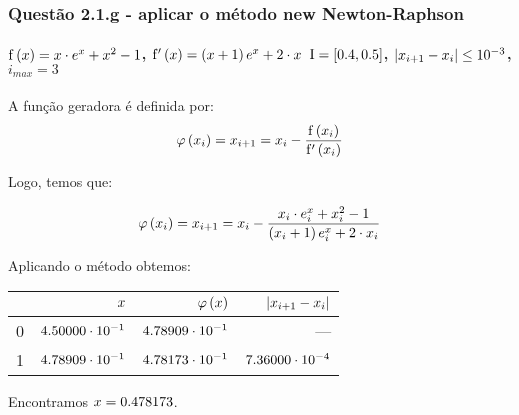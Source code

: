 \begin{frame}
\frametitle{Questão 2.1.g - aplicar o método new Newton-Raphson}
\framesubtitle{$\mathrm{f}\left(x\right) = x \cdot e^x + x^2 - 1$,
$\mathrm{f}'\left(x\right) = \left(x + 1\right)e^x + 2 \cdot x$ 
$\mathrm{I} = [0.4,0.5]$, $|x_{i+1} - x_i| \leq 10^{-3}$, $i_{max} = 3$}

A função geradora é definida por: 
\[
\varphi\left(x_i\right) = x_{i+1} = x_i -
\frac{\mathrm{f}\left(x_i\right)}{\mathrm{f}'\left(x_i\right)}
\]

Logo, temos que:
 
\[
\varphi\left(x_i\right) = x_{i+1} = x_i -
\frac{x_i \cdot e^x_i + x_i^2 - 1}
{\left(x_i + 1\right)e^x_i + 2 \cdot x_i}
\]

Aplicando o método obtemos:\\
{\scriptsize
\begin{center}
\begin{tabular}{r|r|r|r}
  &
  $x$ &
  $\varphi\left(x\right)$ &
  $|x_{i+1} - x_i|$\\
\hline
\hline
0 & $4.50000 \cdot 10^{-1}$ & $4.78909 \cdot 10^{-1}$ & ---\\
\hline
1 & $4.78909 \cdot 10^{-1}$ & $4.78173 \cdot 10^{-1}$ 
  & $7.36000 \cdot 10^{-4}$\\
\hline
\end{tabular}
\end{center}
}

Encontramos $x = 0.478173$.

\end{frame}

